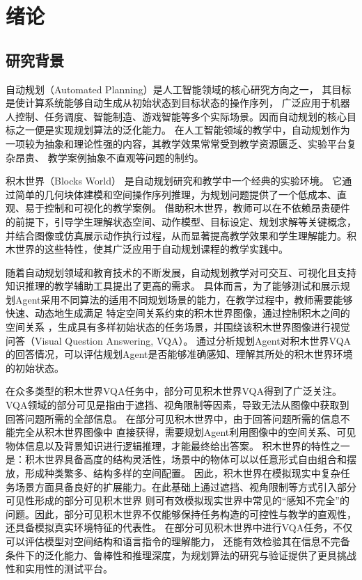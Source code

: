 \chapter{绪论}
\section{研究背景}
自动规划（Automated Planning）是人工智能领域的核心研究方向之一，
其目标是使计算系统能够自动生成从初始状态到目标状态的操作序列，
广泛应用于机器人控制、任务调度、智能制造、游戏智能等多个实际场景。因而自动规划的核心目标之一便是实现规划算法的泛化能力。
在人工智能领域的教学中，自动规划作为一项较为抽象和理论性强的内容，其教学效果常常受到教学资源匮乏、实验平台复杂昂贵、
教学案例抽象不直观等问题的制约。

积木世界（Blocks World） \cite{hogg1983block}是自动规划研究和教学中一个经典的实验环境。
它通过简单的几何块体建模和空间操作序列推理，为规划问题提供了一个低成本、直观、易于控制和可视化的教学案例。
借助积木世界，教师可以在不依赖昂贵硬件的前提下，引导学生理解状态空间、动作模型、目标设定、规划求解等关键概念，
并结合图像或仿真展示动作执行过程，从而显著提高教学效果和学生理解能力。积木世界的这些特性，使其广泛应用于自动规划课程的教学实践中。

随着自动规划领域和教育技术的不断发展，自动规划教学对可交互、可视化且支持知识推理的教学辅助工具提出了更高的需求。
具体而言，为了能够测试和展示规划Agent采用不同算法的适用不同规划场景的能力，在教学过程中，教师需要能够快速、动态地生成满足
特定空间关系约束的积木世界图像，通过控制积木之间的空间关系
，生成具有多样初始状态的任务场景，并围绕该积木世界图像进行视觉问答（Visual Question Answering, VQA）。
通过分析规划Agent对积木世界VQA的回答情况，可以评估规划Agent是否能够准确感知、理解其所处的积木世界环境的初始状态。

在众多类型的积木世界VQA任务中，部分可见积木世界VQA得到了广泛关注。
VQA领域的部分可见是指由于遮挡、视角限制等因素，导致无法从图像中获取到回答问题所需的全部信息。
在部分可见积木世界中，由于回答问题所需的信息不能完全从积木世界图像中
直接获得，需要规划Agent利用图像中的空间关系、可见物体信息以及背景知识进行逻辑推理，才能最终给出答案。
积木世界的特性之一是：积木世界具备高度的结构灵活性，场景中的物体可以以任意形式自由组合和摆放，形成种类繁多、结构多样的空间配置。
因此，积木世界在模拟现实中复杂任务场景方面具备良好的扩展能力。在此基础上通过遮挡、视角限制等方式引入部分可见性形成的部分可见积木世界
则可有效模拟现实世界中常见的“感知不完全”的问题。因此，部分可见积木世界不仅能够保持任务构造的可控性与教学的直观性，还具备模拟真实环境特征的代表性。
在部分可见积木世界中进行VQA任务，不仅可以评估模型对空间结构和语言指令的理解能力，
还能有效检验其在信息不完备条件下的泛化能力、鲁棒性和推理深度，为规划算法的研究与验证提供了更具挑战性和实用性的测试平台。

